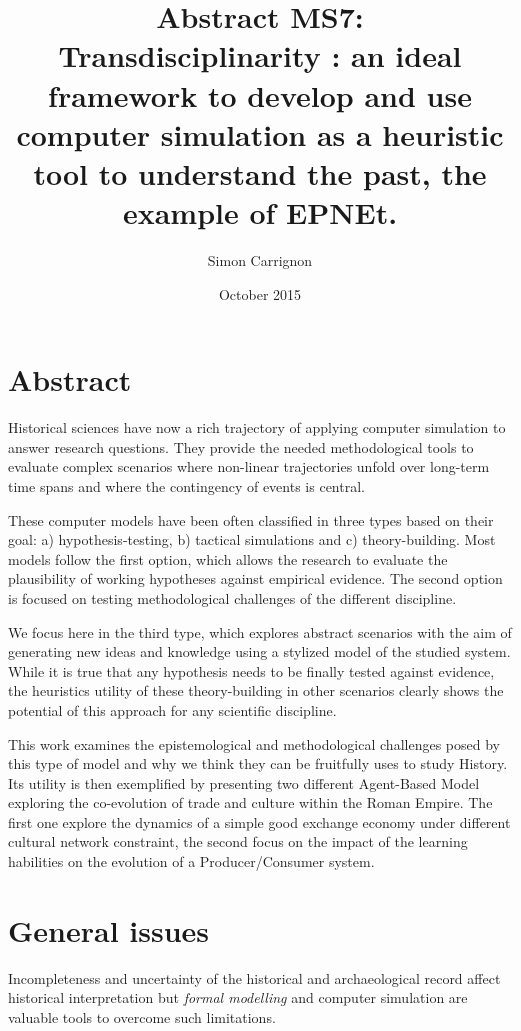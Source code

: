 \documentclass[a4paper]{article}
\title{Abstract MS7:\\ Transdisciplinarity : an ideal framework to develop and use computer simulation as a heuristic tool to understand the past, the example of EPNEt.}
\author{Simon Carrignon}
\date{October 2015}
\begin{document}
\maketitle 


\section*{Abstract}
Historical sciences have now a rich trajectory of applying computer simulation to answer research questions. They provide the needed methodological tools to evaluate complex scenarios where non-linear trajectories unfold over long-term time spans and where the contingency of events is central.

These computer models have been often classified in three types based on their goal: a) hypothesis-testing, b) tactical simulations and c) theory-building. Most models follow the first option, which allows the research to evaluate the plausibility of working hypotheses against empirical evidence. The second option is focused on testing methodological challenges of the different discipline.

We focus here in the third type, which explores abstract scenarios with the aim of generating new ideas and knowledge using a stylized model of the studied system. While it is true that any hypothesis needs to be finally tested against evidence, the heuristics utility of these theory-building in other scenarios clearly shows the potential of this approach for any scientific discipline. 

This work examines the epistemological and methodological challenges posed by this type of model and why we think they can be fruitfully uses to study History. Its utility is then exemplified by presenting two different Agent-Based Model exploring the co-evolution of trade and culture within the Roman Empire. The first one explore the dynamics of a simple good exchange economy under different cultural network constraint, the second focus on the impact of the learning habilities on the evolution of a Producer/Consumer system.


\section{General issues}

Incompleteness and uncertainty of the historical and archaeological record affect historical interpretation \cite{madella2014} but \emph{formal modelling} and computer simulation are valuable tools to overcome such limitations. 
\end{document}
